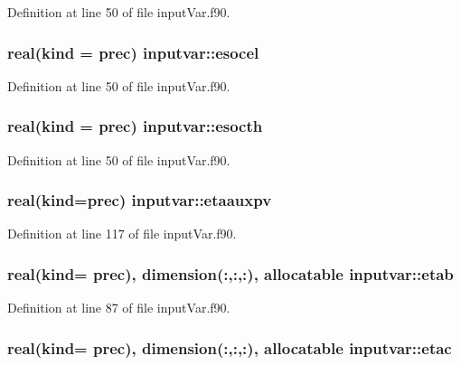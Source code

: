 Definition at line 50 of file input\-Var.\-f90.

\hypertarget{classinputvar_a761214782c22ee31b6da74c0984cb9e2}{
\subsubsection[{esocel}]{\setlength{\rightskip}{0pt plus 5cm}real(kind = prec) inputvar\-::esocel}}\label{classinputvar_a761214782c22ee31b6da74c0984cb9e2}


Definition at line 50 of file input\-Var.\-f90.

\hypertarget{classinputvar_a144453fc737cf5fa64bf329abb73d1c6}{
\subsubsection[{esocth}]{\setlength{\rightskip}{0pt plus 5cm}real(kind = prec) inputvar\-::esocth}}\label{classinputvar_a144453fc737cf5fa64bf329abb73d1c6}


Definition at line 50 of file input\-Var.\-f90.

\hypertarget{classinputvar_aeb72fc2d7eca7ba95a0fd6dbb0238cf0}{
\subsubsection[{etaauxpv}]{\setlength{\rightskip}{0pt plus 5cm}real(kind=prec) inputvar\-::etaauxpv}}\label{classinputvar_aeb72fc2d7eca7ba95a0fd6dbb0238cf0}


Definition at line 117 of file input\-Var.\-f90.

\hypertarget{classinputvar_adba062c6d3ce600124e2cd8943f7c6e6}{
\subsubsection[{etab}]{\setlength{\rightskip}{0pt plus 5cm}real(kind= prec), dimension(\-:,\-:,\-:), allocatable inputvar\-::etab}}\label{classinputvar_adba062c6d3ce600124e2cd8943f7c6e6}


Definition at line 87 of file input\-Var.\-f90.

\hypertarget{classinputvar_a3c6d7517ec3f9097a8d4264b50e61b48}{
\subsubsection[{etac}]{\setlength{\rightskip}{0pt plus 5cm}real(kind= prec), dimension(\-:,\-:,\-:), allocatable inputvar\-::etac}}\label{classinputvar_a3c6d7517ec3f9097a8d4264b50e61b48}



